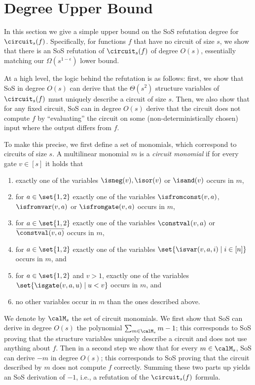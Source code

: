 \section{Degree Upper Bound}
\label{sec:upper-bound}

In this section we give a simple upper bound on the SoS refutation
degree for $\circuit_s(f)$.  Specifically, for functions $f$ that have
no circuit of size $s$, we show that there is an SoS refutation of
$\circuit_s(f)$ of degree $O(s)$, essentially matching our
$\Omega(s^{1-\epsilon})$ lower bound.

At a high level, the logic behind the refutation is as follows: first,
we show that SoS in degree $O(s)$ can derive that the $\Theta(s^2)$
structure variables of $\circuit_s(f)$ must uniquely describe a
circuit of size $s$.  Then, we also show that for any fixed circuit,
SoS can in degree $O(s)$ derive that the circuit does not compute $f$
by ``evaluating'' the circuit on some (non-deterministically chosen)
input where the output differs from $f$.

To make this precise, we first define a set of monomials, which correspond
to circuits of size $s$. A multilinear monomial $m$ is a \emph{circuit
  monomial} if for every gate $v \in [s]$ it holds that
\begin{enumerate}
\item exactly one of the variables $\isneg(v), \isor(v)$ or $\isand(v)$ occurs
  in $m$,
\item for $a \in \set{1,2}$ exactly one of the variables
  $\isfromconst(v, a)$, $\isfromvar(v, a)$ or $\isfromgate(v, a)$ occurs
  in $m$,
\item for $a \in \set{1,2}$ exactly one of the variables
  $\constval(v, a)$ or $\overline{\constval(v, a)}$ occurs in $m$,
\item for $a \in \set{1,2}$ exactly one of the variables
  $\set{\isvar(v,a,i) \mid i \in [n]}$
  occurs in $m$, and
\item for $a \in \set{1,2}$ and $v > 1$, exactly one of the variables
  $\set{\isgate(v,a,u) \mid u < v}$
  occurs in $m$, and
  \item no other variables occur in $m$ than the ones described
    above.
\end{enumerate}
We denote by $\calM_s$ the set of circuit monomials. We first show
that SoS can derive in degree $O(s)$ the polynomial
$\sum_{m \in \calM_s} m - 1$; this corresponds to SoS proving that
the structure variables uniquely describe a circuit and does not use
anything about $f$.  Then in a second step we show that for every
$m \in \calM_s$, SoS can derive $-m$ in degree $O(s)$; this
corresponds to SoS proving that the circuit described by $m$ does not
compute $f$ correctly.  Summing these two parts up yields an SoS
derivation of $-1$, i.e., a refutation of the $\circuit_s(f)$ formula.

